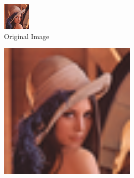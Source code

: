  \begin{figure}
        \centering
        \begin{subfigure}[b]{0.475\textwidth}
            \centering
            \includegraphics[width=\textwidth]{Figures/lena_tiny.png}
            \caption[Network2]%
            {{\small Original Image}}    
            \label{fig:int1}
        \end{subfigure}
        \hfill
        \begin{subfigure}[b]{0.475\textwidth}  
            \centering 
            \includegraphics[width=\textwidth]{Figures/resArea.png}

\end{subfigure}
\end{figure}
